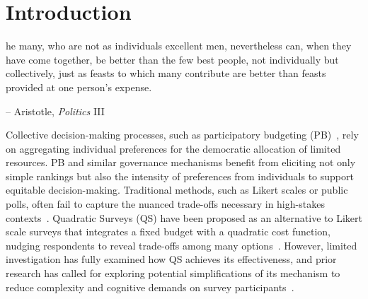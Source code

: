 \section{Introduction}

\begin{displayquote}
[T]he many, who are not as individuals excellent men, nevertheless can, when they have come together, be better than the few best people, not individually but collectively, just as feasts to which many contribute are better than feasts provided at one person's expense.

\begin{flushright}
-- Aristotle, \textit{Politics} III
\end{flushright}
\end{displayquote}

Collective decision-making processes, such as participatory budgeting (PB)~\cite{}, rely on aggregating individual preferences for the democratic allocation of limited resources. PB and similar governance mechanisms benefit from eliciting not only simple rankings but also the intensity of preferences from individuals to support equitable decision-making. Traditional methods, such as Likert scales or public polls, often fail to capture the nuanced trade-offs necessary in high-stakes contexts~\cite{}. Quadratic Surveys (QS) have been proposed as an alternative to Likert scale surveys that integrates a fixed budget with a quadratic cost function, nudging respondents to reveal trade-offs among many options~\cite{chengCanShowWhat2021, quarfoot2017quadratic, cavaille2024cares}. However, limited investigation has fully examined how QS achieves its effectiveness, and prior research has called for exploring potential simplifications of its mechanism to reduce complexity and cognitive demands on survey participants~\cite{cavaille2024cares, chengOrganizeThenVote2025}.


